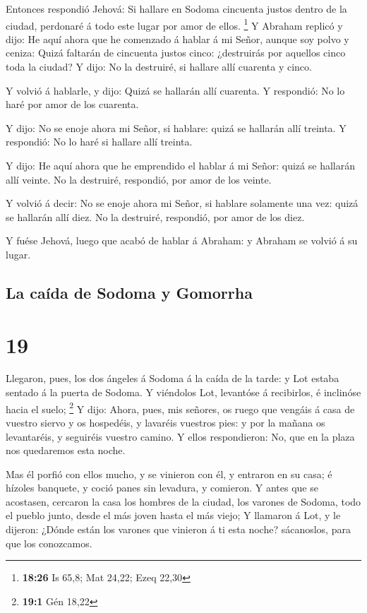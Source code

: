  Entonces respondió Jehová: Si hallare en Sodoma
cincuenta justos dentro de la ciudad, perdonaré á todo este lugar por
amor de ellos. \footnote{\textbf{18:26} Is 65,8; Mat 24,22; Ezeq 22,30}
 Y Abraham replicó y dijo: He aquí ahora que he comenzado
á hablar á mi Señor, aunque soy polvo y ceniza:  Quizá
faltarán de cincuenta justos cinco: ¿destruirás por aquellos cinco toda
la ciudad? Y dijo: No la destruiré, si hallare allí cuarenta y cinco.

 Y volvió á hablarle, y dijo: Quizá se hallarán allí
cuarenta. Y respondió: No lo haré por amor de los cuarenta.

 Y dijo: No se enoje ahora mi Señor, si hablare: quizá se
hallarán allí treinta. Y respondió: No lo haré si hallare allí treinta.

 Y dijo: He aquí ahora que he emprendido el hablar á mi
Señor: quizá se hallarán allí veinte. No la destruiré, respondió, por
amor de los veinte.

 Y volvió á decir: No se enoje ahora mi Señor, si hablare
solamente una vez: quizá se hallarán allí diez. No la destruiré,
respondió, por amor de los diez.

 Y fuése Jehová, luego que acabó de hablar á Abraham: y
Abraham se volvió á su lugar.

\hypertarget{la-cauxedda-de-sodoma-y-gomorrha}{%
\subsection{La caída de Sodoma y
Gomorrha}\label{la-cauxedda-de-sodoma-y-gomorrha}}

\hypertarget{section-18}{%
\section{19}\label{section-18}}

 Llegaron, pues, los dos ángeles á Sodoma á la caída de la
tarde: y Lot estaba sentado á la puerta de Sodoma. Y viéndolos Lot,
levantóse á recibirlos, é inclinóse hacia el suelo; \footnote{\textbf{19:1}
  Gén 18,22}  Y dijo: Ahora, pues, mis señores, os ruego
que vengáis á casa de vuestro siervo y os hospedéis, y lavaréis vuestros
pies: y por la mañana os levantaréis, y seguiréis vuestro camino. Y
ellos respondieron: No, que en la plaza nos quedaremos esta noche.

 Mas él porfió con ellos mucho, y se vinieron con él, y
entraron en su casa; é hízoles banquete, y coció panes sin levadura, y
comieron.  Y antes que se acostasen, cercaron la casa los
hombres de la ciudad, los varones de Sodoma, todo el pueblo junto, desde
el más joven hasta el más viejo;  Y llamaron á Lot, y le
dijeron: ¿Dónde están los varones que vinieron á ti esta noche?
sácanoslos, para que los conozcamos.

